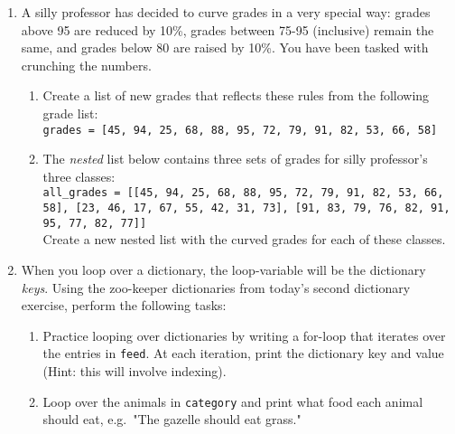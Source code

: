 \documentclass{article}[12pt]
\newcommand{\code}[1]{\texttt{#1}}  %
\begin{document}
\begin{enumerate}[itemsep=5ex]
	
	\item A silly professor has decided to curve grades in a very special way: grades above 95 are reduced by 10\%, grades between 75-95 (inclusive) remain the same, and grades below 80 are raised by 10\%. You have been tasked with crunching the numbers.
	
	\begin{enumerate}[itemsep=2ex]
		\item Create a list of new grades that reflects these rules from the following grade list: \\
		\code{grades = [45, 94, 25, 68, 88, 95, 72, 79, 91, 82, 53, 66, 58]} 
		 
		\item The \emph{nested} list below contains three sets of grades for silly professor's three classes: \\ 
		\code{all\_grades = [[45, 94, 25, 68, 88, 95, 72, 79, 91, 82, 53, 66, 58], [23, 46, 17, 67, 55, 42, 31, 73], [91, 83, 79, 76, 82, 91, 95, 77, 82, 77]]}
		\\ Create a new nested list with the curved grades for each of these classes.
	\end{enumerate}
	
	\item When you loop over a dictionary, the loop-variable will be the dictionary \emph{keys}. Using the zoo-keeper dictionaries from today's second dictionary exercise, perform the following tasks:
	\begin{enumerate}[itemsep=2ex]
		\item Practice looping over dictionaries by writing a for-loop that iterates over the entries in \code{feed}. At each iteration, print the dictionary key and value (Hint: this will involve indexing).
		\item Loop over the animals in \code{category} and print what food each animal should eat, e.g.\ "The gazelle should eat grass." 
	\end{enumerate}


\end{enumerate}
\end{document}

